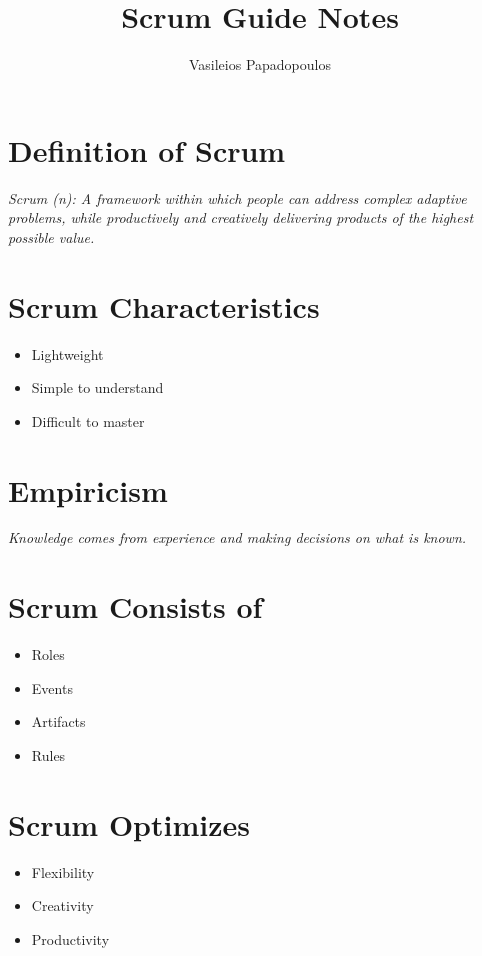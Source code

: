 \documentclass[a4paper,11pt,twocolumn]{article}
\title{\textbf{Scrum Guide Notes} \vspace{-1ex}}
\author{Vasileios Papadopoulos}
\date{}
\begin{document}
\maketitle

\thispagestyle{fancy}

\section*{Definition of Scrum}
\textit{Scrum (n): A framework within which people can address complex adaptive problems, while productively and creatively delivering products of the highest possible value.}

\section*{Scrum Characteristics}
\begin{itemize}
	\item Lightweight
	\item Simple to understand
	\item Difficult to master
\end{itemize}

\section*{Empiricism}
\textit{Knowledge comes from experience and making decisions on what is known.}

\section*{Scrum Consists of}
\begin{itemize}
	\item Roles
	\item Events
	\item Artifacts
	\item Rules
\end{itemize}

\section*{Scrum Optimizes}
\begin{itemize}
	\item Flexibility
	\item Creativity
	\item Productivity
\end{itemize}
\end{document}
